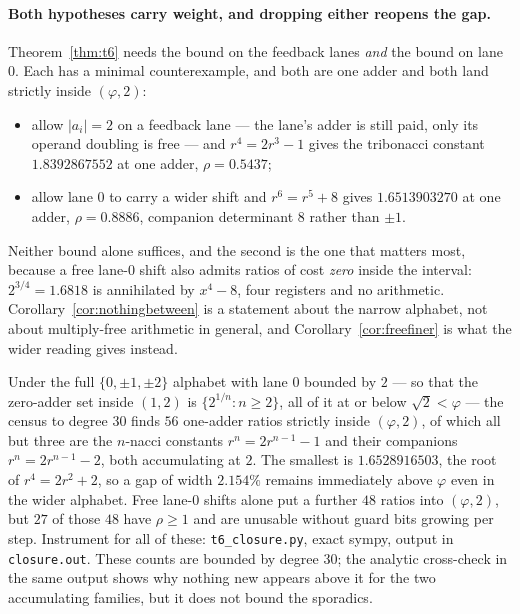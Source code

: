 \documentclass[11pt]{article}
\theoremstyle{definition}
\begin{document}
\paragraph{Both hypotheses carry weight, and dropping either reopens the gap.}
Theorem~\ref{thm:t6} needs the bound on the feedback lanes \emph{and} the bound
on lane $0$. Each has a minimal counterexample, and both are one adder and both
land strictly inside $(\varphi,2)$:
\begin{itemize}[nosep]
\item allow $|a_i|=2$ on a feedback lane --- the lane's adder is still paid, only
      its operand doubling is free --- and $r^{4}=2r^{3}-1$ gives the tribonacci
      constant $1.8392867552$ at one adder, $\rho=0.5437$;
\item allow lane $0$ to carry a wider shift and $r^{6}=r^{5}+8$ gives
      $1.6513903270$ at one adder, $\rho=0.8886$, companion determinant $8$
      rather than $\pm1$.
\end{itemize}
Neither bound alone suffices, and the second is the one that matters most,
because a free lane-$0$ shift also admits ratios of cost \emph{zero} inside the
interval: $2^{3/4}=1.6818$ is annihilated by $x^{4}-8$, four registers and no
arithmetic. Corollary~\ref{cor:nothingbetween} is a statement about the narrow
alphabet, not about multiply-free arithmetic in general, and
Corollary~\ref{cor:freefiner} is what the wider reading gives instead.

Under the full $\{0,\pm1,\pm2\}$ alphabet with lane $0$ bounded by $2$ --- so
that the zero-adder set inside $(1,2)$ is $\{2^{1/n}:n\ge2\}$, all of it at or
below $\sqrt2<\varphi$ --- the census to degree $30$ finds $56$ one-adder ratios
strictly inside $(\varphi,2)$, of which all but three are the $n$-nacci
constants $r^{n}=2r^{n-1}-1$ and their companions $r^{n}=2r^{n-1}-2$, both
accumulating at $2$. The smallest is $1.6528916503$, the root of
$r^{4}=2r^{2}+2$, so a gap of width $2.154\%$ remains immediately above
$\varphi$ even in the wider alphabet. Free lane-$0$ shifts alone put a further
$48$ ratios into $(\varphi,2)$, but $27$ of those $48$ have $\rho\ge1$ and are
unusable without guard bits growing per step. Instrument for all of these:
\texttt{t6\_closure.py}, exact sympy, output in \texttt{closure.out}. These
counts are bounded by degree $30$; the analytic cross-check in the same output
shows why nothing new appears above it for the two accumulating families, but it
does not bound the sporadics.
\end{document}
